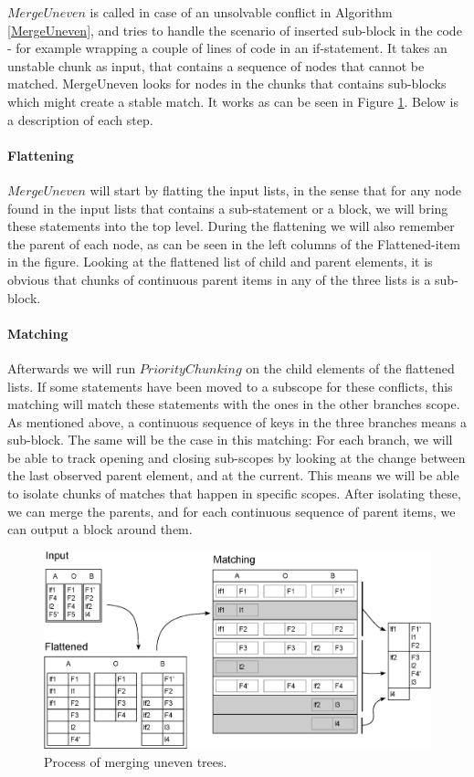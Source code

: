\documentclass[11pt]{article}
\begin{document}
$MergeUneven$ is called in case of an unsolvable conflict in Algorithm \ref{MergeUneven}, and tries to handle the scenario of inserted sub-block in the code - for example wrapping a couple of lines of code in an if-statement. It takes an unstable chunk as input, that contains a sequence of nodes that cannot be matched. MergeUneven looks for nodes in the chunks that contains sub-blocks which might create a stable match. It works as can be seen in Figure \ref{UeventreeProcess}. Below is a description of each step.

\paragraph{Flattening} $MergeUneven$ will start by flatting the input lists, in the sense that for any node found in the input lists that contains a sub-statement or a block, we will bring these statements into the top level. During the flattening we will also remember the parent of each node, as can be seen in the left columns of the Flattened-item in the figure. Looking at the flattened list of child and parent elements,  it is obvious that chunks of continuous parent items in any of the three lists is a sub-block.

\paragraph{Matching} Afterwards we will run $PriorityChunking$ on the child elements of the flattened lists. If some statements have been moved to a subscope for these conflicts, this matching will match these statements with the ones in the other branches scope. As mentioned above, a continuous sequence of keys in the three branches means a sub-block. The same will be the case in this matching: For each branch, we will be able to track opening and closing sub-scopes by looking at the change between the last observed parent element, and at the current. This means we will be able to isolate chunks of matches that happen in specific scopes. After isolating these, we can merge the parents, and for each continuous sequence of parent items, we can output a block around them.

\begin{figure}
   \centerline{\includegraphics[scale=0.55]{drawings/html/EditedFlattenedMerge.eps}}
   \caption{Process of merging uneven trees.}
   \label{UeventreeProcess}
\end{figure}
\end{document}
